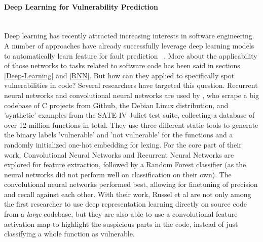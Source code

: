 \documentclass[
	a4paper,
	pagesize,
	pdftex,
	12pt,
	twoside, %
	BCOR=5mm, %
	ngerman,
	fleqn,
	final,
	]{scrartcl}
\begin{document}
\paragraph{Deep Learning for Vulnerability Prediction}\mbox{}\\
Deep learning has recently attracted increasing interests in software engineering. A number of approaches have already successfully leverage deep learning models to automatically learn feature for fault prediction ~\cite{IEEE.2015b,IEEE.2016,Wang.2016}. More about the applicability of those networks to tasks related to software code has been said in sections \ref{Deep-Learning} and \ref{RNN}. But how can they applied to specifically spot vulnerabilities in code? Several researchers have targeted this question.
Recurrent neural networks and convolutional neural networks are used by \cite{Russell.2018}, who scrape a big codebase of C projects from Github, the Debian Linux distribution, and 'synthetic' examples from the SATE IV Juliet test suite, collecting a database of over 12 million functions in total. They use three different static tools to generate the binary labels 'vulnerable' and 'not vulnerable' for the functions and a randomly initialized one-hot embedding for lexing. For the core part of their work, Convolutional Neural Networks and Recurrent Neural Networks are explored for feature extraction, followed by a Random Forest classifier (as the neural networks did not perform well on classification on their own). The convolutional neural networks performed best, allowing for finetuning of precision and recall against each other. With their work, Russel et al are not only among the first researcher to use deep representation learning directly on source code from a \textit{large} codebase, but they are also able to use a convolutional feature activation map to highlight the suspicious parts in the code, instead of just classifying a whole function as vulnerable.\\
\end{document}

